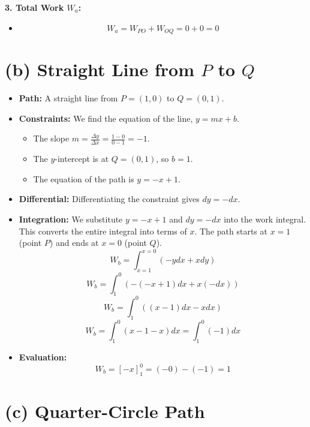 \documentclass[11pt, a4paper]{article} %
\begin{document}
\textbf{3. Total Work $W_a$:}
\begin{itemize}
    \item $$W_a = W_{PO} + W_{OQ} = 0 + 0 = 0$$
\end{itemize}

\hrulefill

\section*{(b) Straight Line from $P$ to $Q$}

\begin{itemize}
    \item \textbf{Path:} A straight line from $P=(1,0)$ to $Q=(0,1)$.
    \item \textbf{Constraints:} We find the equation of the line, $y = mx + b$.
    \begin{itemize}
        \item The slope $m = \frac{\Delta y}{\Delta x} = \frac{1-0}{0-1} = -1$.
        \item The $y$-intercept is at $Q=(0,1)$, so $b=1$.
        \item The equation of the path is $y = -x + 1$.
    \end{itemize}
    \item \textbf{Differential:} Differentiating the constraint gives $dy = -dx$.
    \item \textbf{Integration:} We substitute $y = -x + 1$ and $dy = -dx$ into the work integral. This converts the entire integral into terms of $x$. The path starts at $x=1$ (point $P$) and ends at $x=0$ (point $Q$).
    $$W_b = \int_{x=1}^{x=0} (-y dx + x dy)$$
    $$W_b = \int_1^0 \left( -(-x+1) dx + x(-dx) \right)$$
    $$W_b = \int_1^0 \left( (x-1) dx - x dx \right)$$
    $$W_b = \int_1^0 (x - 1 - x) dx = \int_1^0 (-1) dx$$
    \item \textbf{Evaluation:}
    $$W_b = \left[ -x \right]_1^0 = (-0) - (-1) = 1$$
\end{itemize}

\hrulefill

\section*{(c) Quarter-Circle Path}
\end{document}
